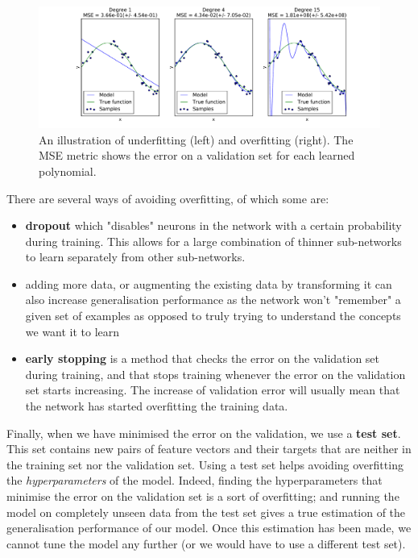 \begin{figure}
	\centering
	\includegraphics[width=0.8\linewidth]{fig/overfitting.pdf}
	\caption{An illustration of underfitting (left) and overfitting (right).
	The MSE metric shows the error on a validation set for each learned
	polynomial.}
	\label{fig:overfitting}
\end{figure}

There are several ways of avoiding overfitting, of which some are:
\begin{itemize}
	\item \textbf{dropout} \cite{dropout} which "disables" neurons in the 
		network with a certain probability during training. This allows
		for a large combination of thinner sub-networks to learn
		separately from other sub-networks.
	\item adding more data, or augmenting the existing data by transforming
		it can also increase generalisation performance as the network
		won't "remember" a given set of examples as opposed to truly
		trying to understand the concepts we want it to learn
	\item \textbf{early stopping} is a method that checks the error
		on the validation set during training, and that stops training
		whenever the error on the validation set starts increasing.
		The increase of validation error will usually mean that the
		network has started overfitting the training data.
\end{itemize}

Finally, when we have minimised the error on the validation, we use 
a \textbf{test set}. This set contains new pairs of feature vectors and their
targets that are neither in the training set nor the validation set. Using
a test set helps avoiding overfitting the \textit{hyperparameters} of the model.
Indeed, finding the hyperparameters that minimise the error on the validation
set is a sort of overfitting; and running the model on completely unseen
data from the test set gives a true estimation of the generalisation performance
of our model. Once this estimation has been made, we cannot tune the model
any further (or we would have to use a different test set).

